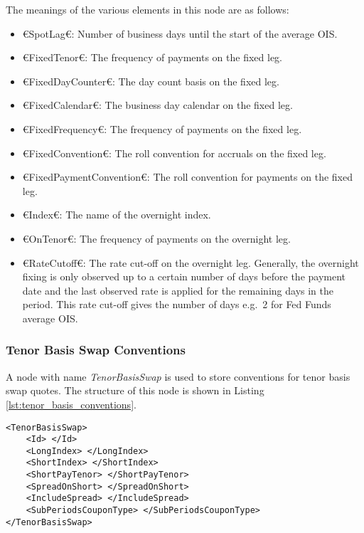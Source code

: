 The meanings of the various elements in this node are as follows:
\begin{itemize}
\item €SpotLag€: Number of business days until the start of the average OIS.
\item €FixedTenor€: The frequency of payments on the fixed leg.
\item €FixedDayCounter€: The day count basis on the fixed leg.
\item €FixedCalendar€: The business day calendar on the fixed leg.
\item €FixedFrequency€: The frequency of payments on the fixed leg.
\item €FixedConvention€: The roll convention for accruals on the fixed leg.
\item €FixedPaymentConvention€: The roll convention for payments on the fixed leg.
\item €Index€: The name of the overnight index.
\item €OnTenor€: The frequency of payments on the overnight leg.
\item €RateCutoff€: The rate cut-off on the overnight leg. Generally, the overnight fixing is only observed up to a certain 
number of days before the payment date and the last observed rate is applied for the remaining days in the period. This 
rate cut-off gives the number of days e.g.\ 2 for Fed Funds average OIS.
\end{itemize}

\subsubsection{Tenor Basis Swap Conventions}
A node with name \emph{TenorBasisSwap} is used to store conventions for tenor basis swap quotes. The structure of this 
node is shown in Listing \ref{lst:tenor_basis_conventions}.

{\footnotesize
\begin{lstlisting}[caption={Tenor basis swap conventions}, label=lst:tenor_basis_conventions]
<TenorBasisSwap>
	<Id> </Id>
	<LongIndex> </LongIndex>
	<ShortIndex> </ShortIndex>
	<ShortPayTenor> </ShortPayTenor>
	<SpreadOnShort> </SpreadOnShort>
	<IncludeSpread> </IncludeSpread>
	<SubPeriodsCouponType> </SubPeriodsCouponType>
</TenorBasisSwap>
\end{lstlisting}
}

